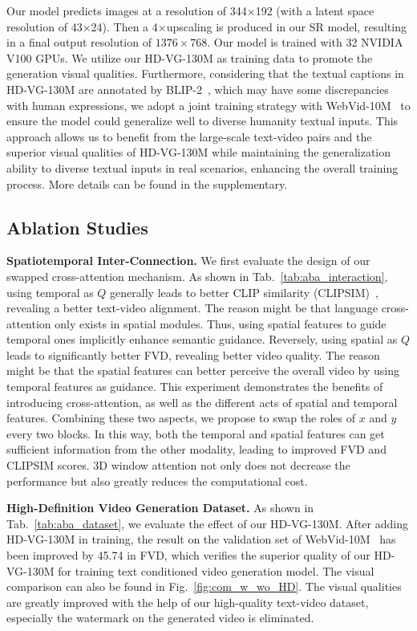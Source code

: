 \documentclass{article}
\begin{document}
Our model predicts images at a resolution of 344$\times$192 (with a latent space resolution of 43$\times$24). Then a 4$\times$upscaling is produced in our SR model, resulting in a final output resolution of $1376\times768$.
Our model is trained with 32 NVIDIA V100 GPUs.
We utilize our HD-VG-130M as training data to promote the generation visual qualities. Furthermore, considering that the textual captions in HD-VG-130M are annotated by BLIP-2~\cite{li2023blip}, which may have some discrepancies with human expressions, we adopt a joint training strategy with WebVid-10M~\cite{bain2021frozen} to ensure the model could generalize well to diverse humanity textual inputs. 
This approach allows us to benefit from the large-scale text-video pairs and the superior visual qualities of HD-VG-130M while maintaining the generalization ability to diverse textual inputs in real scenarios, enhancing the overall training process.
More details can be found in the supplementary.



\subsection{Ablation Studies}


\noindent\textbf{Spatiotemporal Inter-Connection.}
We first evaluate the design of our swapped cross-attention mechanism. 
As shown in Tab.~\ref{tab:aba_interaction}, using temporal as $Q$ generally leads to better CLIP similarity (CLIPSIM)~\cite{CLIP}, revealing a better text-video alignment.
The reason might be that language cross-attention only exists in spatial modules. Thus, using spatial features to guide temporal ones implicitly enhance semantic guidance.
Reversely, using spatial as $Q$ leads to significantly better FVD, revealing better video quality. The reason might be that the spatial features can better perceive the overall video by using temporal features as guidance.
This experiment demonstrates the benefits of introducing cross-attention, as well as the different acts of spatial and temporal features.
Combining these two aspects, we propose to swap the roles of $x$ and $y$ every two blocks.
In this way, both the temporal and spatial features can get sufficient information from the other modality, leading to improved FVD and CLIPSIM scores.
3D window attention not only does not decrease the performance but also greatly reduces the computational cost.

\noindent\textbf{High-Definition Video Generation Dataset.}
As shown in Tab.~\ref{tab:aba_dataset}, we evaluate the effect of our HD-VG-130M. After adding HD-VG-130M in training, the result on the validation set of WebVid-10M~\cite{bain2021frozen} has been improved by 45.74 in FVD, which verifies the superior quality of our HD-VG-130M for training text conditioned video generation model. The visual comparison can also be found in Fig.~\ref{fig:com_w_wo_HD}. The visual qualities are greatly improved with the help of our high-quality text-video dataset, especially the watermark on the generated video is eliminated.
\end{document}
